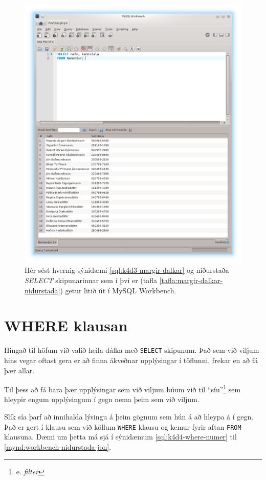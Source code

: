 \begin{figure}
\caption[Niðurstöður margra dálka SELECT í Workbench]{Hér sést hvernig sýnidæmi \ref{sql:k4d3-margir-dalkar} og niðurstaða \emph{SELECT} skipunarinnar sem í því er (tafla \ref{tafla:margir-dalkar-nidurstada}) getur litið út í MySQL Workbench.}
\label{mynd:workbench-nidurstada-margir-dalkar}
\centering
\includegraphics[width=\linewidth]{myndir/workbench-nidurstada-margir-dalkar}
\end{figure}

\newpage
\section{WHERE klausan}
Hingað til höfum við valið heila dálka með \verb|SELECT| skipunum. Það sem við viljum hins vegar oftast gera er að finna ákveðnar upplýsingar í töflunni, frekar en að fá þær allar.

Til þess að fá bara þær upplýsingar sem við viljum búum við til ``síu''\footnote{e. \emph{filter}} sem hleypir engum upplýsingum í gegn nema þeim sem við viljum.

Slík sía þarf að innihalda lýsingu á þeim gögnum sem hún á að hleypa á í gegn. Það er gert í klausu sem við köllum \verb|WHERE| klausu og kemur fyrir aftan \verb|FROM| klausuna. Dæmi um þetta má sjá í sýnidæmum \ref{sql:k4d4-where-numer} til \ref{mynd:workbench-nidurstada-jon}.

